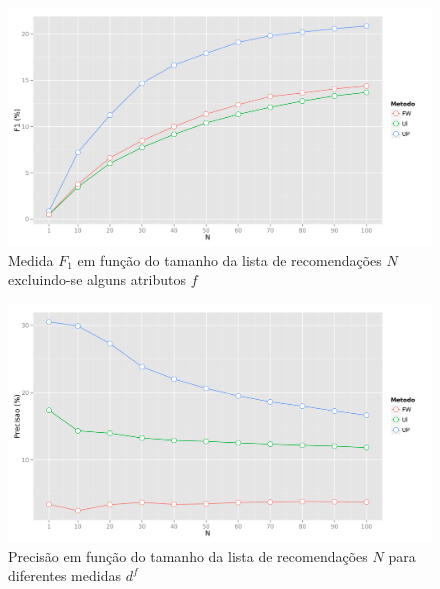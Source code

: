 {\begin{figure}[hp]
    \begin{center}
    \includegraphics[width=1\textwidth]{img/F1_N_F}
    \end{center}
    \caption{Medida $F_1$ em função do tamanho da lista de recomendações $N$ excluindo-se alguns atributos $f$}
    \label{fig:F1_N_F}
\end{figure}

\begin{figure}[hp]
    \begin{center}
    \includegraphics[width=1\textwidth]{img/precision_N_d}
    \end{center}
    \caption{Precisão em função do tamanho da lista de recomendações $N$ para diferentes medidas $d^f$}
    \label{fig:precision_N_d}
\end{figure}


}
